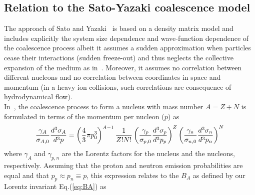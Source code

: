 \documentclass[a4paper,11pt]{scrartcl} %
\begin{document}
\newpage
\begin{appendix}
\section{Relation to the Sato-Yazaki coalescence model}\label{appendix:Sato}
The approach of Sato and Yazaki~\cite{Sato:1981ez} is based on a density matrix model and includes explicitly the system size dependence and wave-function dependence of the coalescence process albeit it assumes a sudden approximation when particles cease their interactions (sudden freeze-out) and thus neglects the collective expansion of the medium as in~\cite{Scheibl:1998tk}. Moreover, it assumes no correlation between different nucleons and no correlation between coordinates in space and momentum (in a heavy ion collisions, such correlations are consequence of hydrodynamical flow). 
\\In~\cite{Sato:1981ez}, the coalescence process to form a nucleus with mass number $A = Z + N$ is formulated in terms of the momentum per nucleon ($p$) as
%
\begin{equation}
\frac{\gamma_{A}}{\sigma_{A,0}} \frac{d^{3}\sigma_{A}}{d^{3}p} =  \left( {4 \over 3} \pi p_{0}^{3}\right)^{A-1}\frac{1}{Z! N!} \left(\frac{\gamma_{p}}{\sigma_{p,0}} \frac{d^{3}\sigma_{p}}{d^{3}p_{p}}\right)^{Z} \left(\frac{\gamma_{n}}{\sigma_{n,0}} \frac{d^{3}\sigma_{n}}{d^{3}p_{n}}\right)^{N} 
\end{equation} 
%
where $\gamma_{A}$ and $\gamma_{p,n}$ are the Lorentz factors for the nucleus and the nucleons, respectively. 
Assuming that the proton and neutron emission probabilities are equal and that $p_{p} \approx p_{n} \equiv p$, this expression relates to the $B_{A}$ as defined by our Lorentz invariant Eq.(\ref{eq:BA}) as


\end{appendix}
\end{document}

